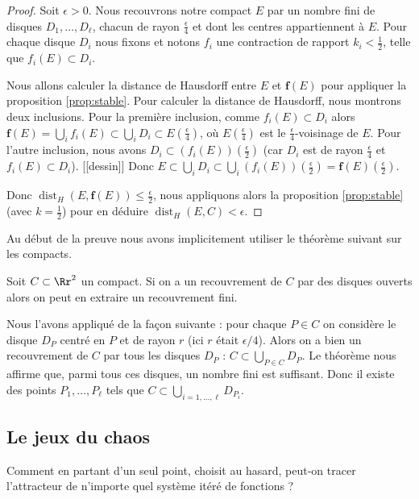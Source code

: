\documentclass[11pt,class=report,crop=false]{standalone}
\DeclareMathOperator{\dist}{dist}
\begin{document}
\begin{proof}
Soit $\epsilon >0$. Nous recouvrons notre compact 
$E$ par un nombre fini de disques $D_1,\ldots,D_\ell$,
chacun de rayon $\frac{\epsilon}{4}$ et dont les centres appartiennent à $E$.
Pour chaque disque $D_i$ nous fixons et notons $f_i$ une contraction de rapport $k_i < \frac 12$,
telle que $f_i(E)\subset D_i$.

Nous allons calculer la distance de Hausdorff entre $E$ et $\mathbf{f}(E)$ pour appliquer
la proposition \ref{prop:stable}.
Pour calculer la distance de Hausdorff, nous montrons deux inclusions.
Pour la première inclusion, comme $f_i(E) \subset D_i$ alors $\mathbf{f}(E)=\bigcup_{i} f_i(E) \subset \bigcup_i D_i
\subset E(\frac{\epsilon}{4})$, où $E(\frac{\epsilon}{4})$ est le $\frac{\epsilon}{4}$-voisinage de $E$.
Pour l'autre inclusion, nous avons $D_i \subset (f_i(E))(\frac \epsilon 2)$ 
(car $D_i$ est de rayon $\frac\epsilon 4$ et $f_i(E) \subset D_i$).
[[dessin]]
Donc $E \subset \bigcup_i D_i \subset \bigcup_i (f_i(E))(\frac \epsilon 2) = \mathbf{f}(E)(\frac\epsilon 2)$.

Donc $\dist_H(E,\mathbf{f}(E)) \le \frac \epsilon 2$, nous appliquons alors
la proposition \ref{prop:stable} (avec $k=\frac12$) pour en déduire $\dist_H(E,C) < \epsilon$.
\end{proof}

\bigskip

Au début de la preuve nous avons implicitement utiliser le théorème suivant sur les compacts.
\begin{theoreme}
Soit $C \subset \Rr^2$ un compact.
Si on a un recouvrement de $C$ par des disques ouverts alors on peut en extraire un recouvrement fini. 
\end{theoreme}
Nous l'avons appliqué de la façon suivante :
pour chaque $P \in C$ on considère le disque $D_P$ centré en $P$ et de rayon $r$ 
(ici $r$ était $\epsilon/4$). Alors on a bien un recouvrement de $C$ par tous les disques $D_P$ :
$C \subset \bigcup_{P\in C} D_P$. Le théorème nous affirme que, parmi tous ces disques, un nombre fini est suffisant.
Donc il existe des points $P_1,\ldots, P_\ell$ tels que $C \subset \bigcup_{i=1,\ldots,\ell} D_{P_i}$.


\subsection{Le jeux du chaos}

Comment en partant d'un seul point, choisit au hasard, peut-on tracer l'attracteur de n'importe quel système itéré de fonctions ?
\end{document}
